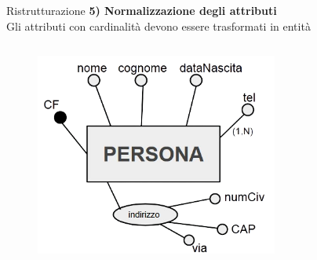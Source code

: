 \begin{frame}{Ristrutturazione}
\textbf{5) Normalizzazione degli attributi}
\\\vspace{2em}
Gli attributi con cardinalit\`a devono essere trasformati in entit\`a
\begin{columns}
        \begin{column}{0.5\textwidth}
            \begin{figure}[h]
        \centering
        \includegraphics[width=0.75\textwidth]{img/i10.png}
    \end{figure}
        \end{column}
        \begin{column}{0.5\textwidth}
        \end{column}
    \end{columns}
\end{frame}
